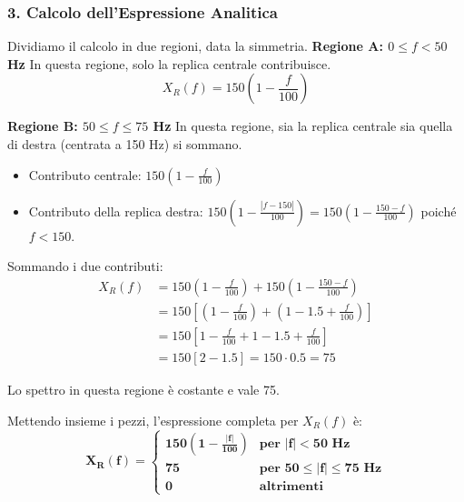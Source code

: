 \begin{soluzione}{7}
    \subsubsection*{3. Calcolo dell'Espressione Analitica}
    Dividiamo il calcolo in due regioni, data la simmetria.
    \textbf{Regione A: $0 \le f < 50$ Hz}
    In questa regione, solo la replica centrale contribuisce.
    \[
        X_R(f) = 150 \left(1 - \frac{f}{100}\right)
    \]
    
    \textbf{Regione B: $50 \le f \le 75$ Hz}
    In questa regione, sia la replica centrale sia quella di destra (centrata a 150 Hz) si sommano.
    \begin{itemize}
        \item Contributo centrale: $150 \left(1 - \frac{f}{100}\right)$
        \item Contributo della replica destra: $150 \left(1 - \frac{|f-150|}{100}\right) = 150 \left(1 - \frac{150-f}{100}\right)$ poiché $f < 150$.
    \end{itemize}
    Sommando i due contributi:
    \begin{align*}
        X_R(f) &= 150 \left(1 - \frac{f}{100}\right) + 150 \left(1 - \frac{150-f}{100}\right) \\
        &= 150 \left[ \left(1 - \frac{f}{100}\right) + \left(1 - 1.5 + \frac{f}{100}\right) \right] \\
        &= 150 \left[ 1 - \frac{f}{100} + 1 - 1.5 + \frac{f}{100} \right] \\
        &= 150 \left[ 2 - 1.5 \right] = 150 \cdot 0.5 = 75
    \end{align*}
    
    Lo spettro in questa regione è costante e vale 75.

    Mettendo insieme i pezzi, l'espressione completa per $X_R(f)$ è:
    \[ \mathbf{X_R(f) = 
        \begin{cases} 
            150 \left(1 - \frac{|f|}{100}\right) & \text{per } |f| < 50 \text{ Hz} \\
            75 & \text{per } 50 \le |f| \le 75 \text{ Hz} \\
            0 & \text{altrimenti}
        \end{cases}}
    \]


\end{soluzione}
